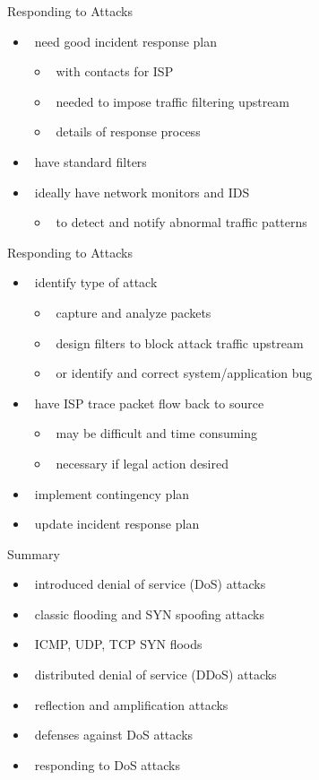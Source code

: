 \documentclass{beamer}
\begin{document}
\begin{frame}{Responding to Attacks }
  \begin{itemize}
  \item  need good incident response plan 
    \begin{itemize}
    \item  with contacts for ISP 
    \item  needed to impose traffic filtering upstream 
    \item  details of response process 
    \end{itemize}
  \item  have standard filters 
  \item  ideally have network monitors and IDS 
    \begin{itemize}
    \item  to detect and notify abnormal traffic patterns 
    \end{itemize}
  \end{itemize}
\end{frame}



\begin{frame}{Responding to Attacks}
  \begin{itemize}
  \item  identify type of attack 
    \begin{itemize}
    \item  capture and analyze packets 
    \item  design filters to block attack traffic upstream 
    \item  or identify and correct system/application bug 
    \end{itemize}
  \item  have ISP trace packet flow back to source 
    \begin{itemize}
    \item  may be difficult and time consuming 
    \item  necessary if legal action desired 
    \end{itemize}
  \item  implement contingency plan 
  \item  update incident response plan 
  \end{itemize}
\end{frame}



\begin{frame}{Summary}
  \begin{itemize}
  \item  introduced denial of service (DoS) attacks 
  \item  classic flooding and SYN spoofing attacks 
  \item  ICMP, UDP, TCP SYN floods 
  \item  distributed denial of service (DDoS) attacks 
  \item  reflection and amplification attacks 
  \item  defenses against DoS attacks 
  \item  responding to DoS attacks 
  \end{itemize}
\end{frame}
\end{document}

